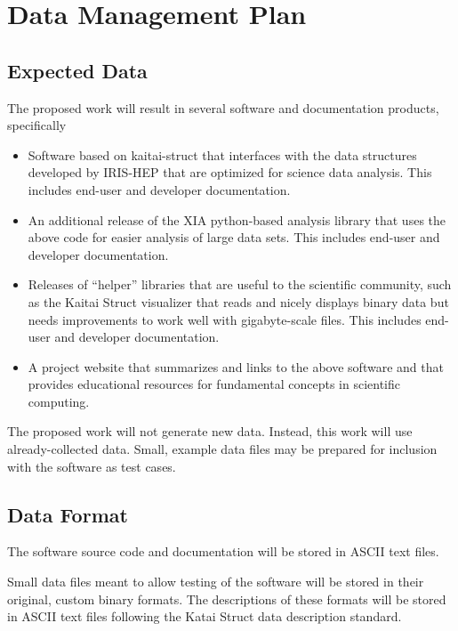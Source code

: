 \documentclass[11pt]{article}
\begin{document}

\section*{Data Management Plan}

\subsection{Expected Data}

The proposed work will result in several software and documentation products, specifically

\begin{itemize}
    \item Software based on kaitai-struct that interfaces with the data structures developed by IRIS-HEP that are optimized for science data analysis.  This includes end-user and developer documentation.
    \item An additional release of the XIA python-based analysis library that uses the above code for easier analysis of large data sets.  This includes end-user and developer documentation.
    \item Releases of ``helper'' libraries that are useful to the scientific community, such as the Kaitai Struct visualizer that reads and nicely displays binary data but needs improvements to work well with gigabyte-scale files.  This includes end-user and developer documentation.
    \item A project website that summarizes and links to the above software and that provides educational resources for fundamental concepts in scientific computing.
\end{itemize}

The proposed work will not generate new data.  Instead, this work will use already-collected data.  Small, example data files may be prepared for inclusion with the software as test cases.

\subsection{Data Format}
The software source code and documentation will be stored in ASCII text files.  

Small data files meant to allow testing of the software will be stored in their original, custom binary formats.  The descriptions of these formats will be stored in ASCII text files following the Katai Struct data description standard.
\end{document}
